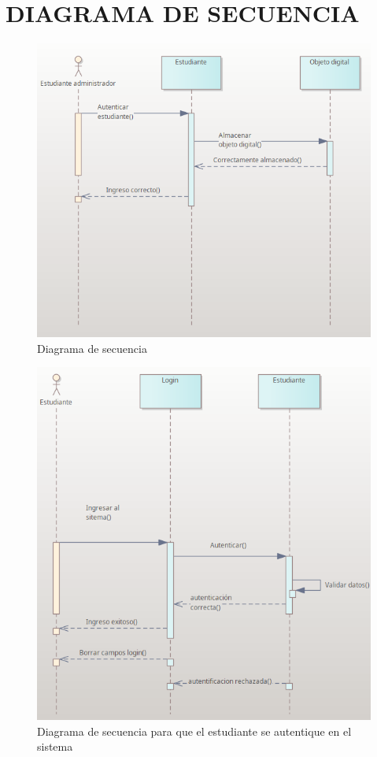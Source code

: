 \chapter*{DIAGRAMA DE SECUENCIA}

\begin{figure}[ht]
	\centering
	\includegraphics[scale=0.8]{images/secuencia1.png}
	\caption{Diagrama de secuencia}
\end{figure}

\begin{figure}[ht]
	\centering
	\includegraphics[scale=0.8]{images/secuencia2.png}
	\caption{Diagrama de secuencia para que el estudiante se autentique en el sistema}
\end{figure}
